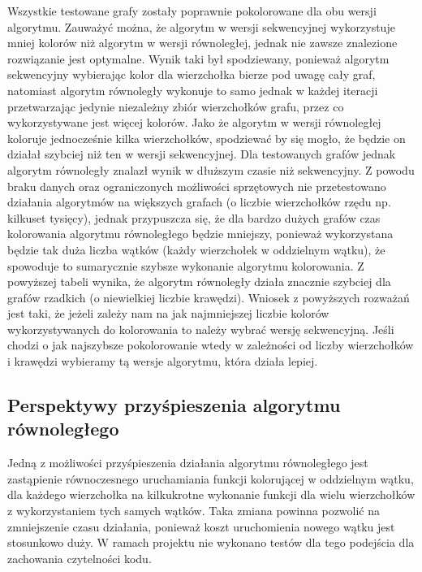 \documentclass{article}
\begin{document}
	Wszystkie testowane grafy zostały poprawnie pokolorowane dla obu wersji algorytmu. Zauważyć można, że algorytm w wersji sekwencyjnej wykorzystuje mniej kolorów niż algorytm w wersji równoległej, jednak nie zawsze znalezione rozwiązanie jest optymalne. Wynik taki był spodziewany, ponieważ algorytm sekwencyjny wybierając kolor dla wierzchołka bierze pod uwagę cały graf, natomiast algorytm równoległy wykonuje to samo jednak w każdej iteracji przetwarzając jedynie niezależny zbiór wierzchołków grafu, przez co wykorzystywane jest więcej kolorów. Jako że algorytm w wersji równoległej koloruje jednocześnie kilka wierzchołków, spodziewać by się mogło, że będzie on działał szybciej niż ten w wersji sekwencyjnej. Dla testowanych grafów jednak algorytm równoległy znalazł wynik w dłuższym czasie niż sekwencyjny. Z powodu braku danych oraz ograniczonych możliwości sprzętowych nie przetestowano działania algorytmów na większych grafach (o liczbie wierzchołków rzędu np. kilkuset tysięcy), jednak przypuszcza się, że dla bardzo dużych grafów czas kolorowania algorytmu równoległego będzie mniejszy, ponieważ wykorzystana będzie tak duża liczba wątków (każdy wierzchołek w oddzielnym wątku), że spowoduje to sumarycznie szybsze wykonanie algorytmu kolorowania. Z powyższej tabeli wynika, że algorytm równoległy działa znacznie szybciej dla grafów rzadkich (o niewielkiej liczbie krawędzi). Wniosek z powyższych rozważań jest taki, że jeżeli zależy nam na jak najmniejszej liczbie kolorów wykorzystywanych do kolorowania to należy wybrać wersję sekwencyjną. Jeśli chodzi o jak najszybsze pokolorowanie wtedy w zależności od liczby wierzchołków i krawędzi wybieramy tą wersje algorytmu, która działa lepiej.
	
	\subsection{Perspektywy przyśpieszenia algorytmu równoległego}
	Jedną z możliwości przyśpieszenia działania algorytmu równoległego jest zastąpienie równoczesnego uruchamiania funkcji kolorującej w oddzielnym wątku, dla każdego wierzchołka na kilkukrotne wykonanie funkcji dla wielu wierzchołków z wykorzystaniem tych samych wątków. Taka zmiana powinna pozwolić na zmniejszenie czasu działania, ponieważ koszt uruchomienia nowego wątku jest stosunkowo duży. W ramach projektu nie wykonano testów dla tego podejścia dla zachowania czytelności kodu.
	
	

 


\end{document}
